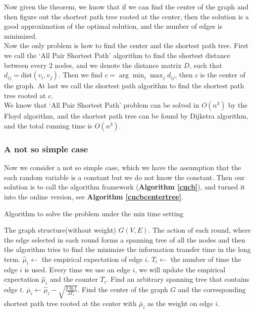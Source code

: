 \documentclass{article}
\theoremstyle{plain}
\theoremstyle{definition}
\theoremstyle{remark}
\begin{document}
    Now given the theorem, we know that if we can find the center of the graph and then figure out the shortest path tree rooted at the center, then the solution is a good approximation of the optimal solution, and the number of edges is minimized.\\

    Now the only problem is how to find the center and the shortest path tree. First we call the `All Pair Shortest Path' algorithm to find the shortest distance between every $2$ nodes, and we denote the distance matrix $D$, such that $d_{ij} = \text{dist}(v_i,v_j)$. Then we find $c = \arg\min_{i}\max_j d_{ij}$, then $c$ is the center of the graph. At last we call the shortest path algorithm to find the shortest path tree rooted at $c$.\\

    We know that `All Pair Shortest Path' problem can be solved in $O(n^3)$ by the Floyd algorithm, and the shortest path tree can be found by Dijkstra algorithm, and the total running time is $O(n^3)$.

    \subsubsection{A not so simple case}
    Now we consider a not so simple case, which we have the assumption that the each random variable is a constant but we do not know the constant. Then our solution is to call the algorithm framework (\textbf{Algorithm \ref{cucb}}), and turned it into the online version, see \textbf{Algorithm \ref{cucbcentertree}}.

    \begin{algorithm}
        \caption{Algorithm to solve the problem under the min time setting}
        \label{cucbcentertree}
        \begin{algorithmic}[1]
        \Require The graph structure(without weight) $G(V,E)$.
        \Ensure The action of each round, where the edge selected in each round forms a spanning tree of all the nodes and then the algorithm tries to find the minimize the information transfer time in the long term.
            \State $\hat \mu_i \leftarrow$ the empirical expectation of edge $i$.
            \State $T_i \leftarrow$ the number of time the edge $i$ is used.
            \State Every time we use an edge $i$, we will update the empirical expectation $\hat \mu_i$ and the counter $T_i$.
                \State Find an arbitrary spanning tree that contains edge $t$.
            \EndFor
                \State $\bar\mu_i \leftarrow \hat\mu_i - \sqrt{\frac{3\ln t}{2T_i}}$.
                \State Find the center of the graph $G$ and the corresponding shortest path tree rooted at the center with $\bar\mu_i$ as the weight on edge $i$.
            \EndFor
        \EndProcedure
        \end{algorithmic}
    \end{algorithm}
\end{document}
